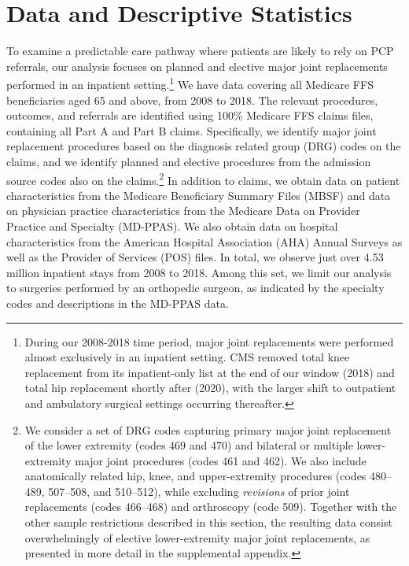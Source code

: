 \documentclass[12pt]{article}
\begin{document}

\section{Data and Descriptive Statistics}
\label{sec:data}

To examine a predictable care pathway where patients are likely to rely on PCP referrals, our analysis focuses on planned and elective major joint replacements performed in an inpatient setting.\footnote{During our 2008-2018 time period, major joint replacements were performed almost exclusively in an inpatient setting. CMS removed total knee replacement from its inpatient-only list at the end of our window (2018) and total hip replacement shortly after (2020), with the larger shift to outpatient and ambulatory surgical settings occurring thereafter.} We have data covering all Medicare FFS beneficiaries aged 65 and above, from 2008 to 2018. The relevant procedures, outcomes, and referrals are identified using 100\% Medicare FFS claims files, containing all Part A and Part B claims. Specifically, we identify major joint replacement procedures based on the diagnosis related group (DRG) codes on the claims, and we identify planned and elective procedures from the admission source codes also on the claims.\footnote{We consider a set of DRG codes capturing primary major joint replacement of the lower extremity (codes 469 and 470) and bilateral or multiple lower-extremity major joint procedures (codes 461 and 462). We also include anatomically related hip, knee, and upper-extremity procedures (codes 480--489, 507--508, and 510--512), while excluding \textit{revisions} of prior joint replacements (codes 466--468) and arthroscopy (code 509). Together with the other sample restrictions described in this section, the resulting data consist overwhelmingly of elective lower-extremity major joint replacements, as presented in more detail in the supplemental appendix.} In addition to claims, we obtain data on patient characteristics from the Medicare Beneficiary Summary Files (MBSF) and data on physician practice characteristics from the Medicare Data on Provider Practice and Specialty (MD-PPAS). We also obtain data on hospital characteristics from the American Hospital Association (AHA) Annual Surveys as well as the Provider of Services (POS) files. In total, we observe just over 4.53 million inpatient stays from 2008 to 2018. Among this set, we limit our analysis to surgeries performed by an orthopedic surgeon, as indicated by the specialty codes and descriptions in the MD-PPAS data.
\end{document}
